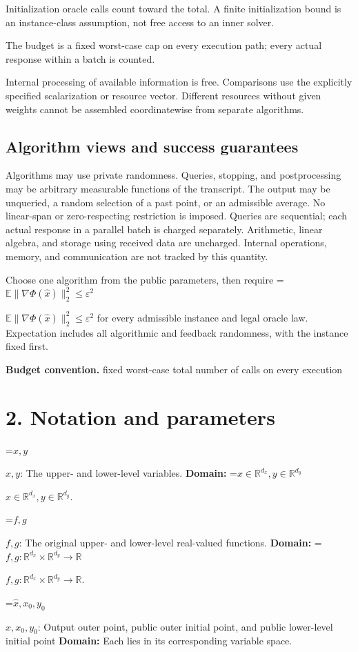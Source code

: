 \documentclass[10pt,a4paper]{article}
\newcommand{\AtlasMath}[1]{\par\begingroup\centering\setbox0=\hbox{$\displaystyle #1$}\ifdim\wd0>1.4\linewidth\typeout{ATLAS WIDE FORMULA: \the\wd0}\fi\ifdim\wd0>\linewidth\resizebox{\linewidth}{!}{\box0}\else\box0\fi\par\endgroup}
\newcommand{\AtlasInlineMath}[1]{\begingroup\setbox0=\hbox{$#1$}\ifdim\wd0>.4\linewidth\endgroup\AtlasMath{#1}\else\endgroup$#1$\fi}
\begin{document}
Initialization oracle calls count toward the total. A finite initialization bound is an instance-class assumption, not free access to an inner solver.

The budget is a fixed worst-case cap on every execution path; every actual response within a batch is counted.

Internal processing of available information is free. Comparisons use the explicitly specified scalarization or resource vector. Different resources without given weights cannot be assembled coordinatewise from separate algorithms.

\subsection{Algorithm views and success guarantees}
Algorithms may use private randomness. Queries, stopping, and postprocessing may be arbitrary measurable functions of the transcript. The output may be unqueried, a random selection of a past point, or an admissible average. No linear-span or zero-respecting restriction is imposed. Queries are sequential; each actual response in a parallel batch is charged separately. Arithmetic, linear algebra, and storage using received data are uncharged. Internal operations, memory, and communication are not tracked by this quantity.

Choose one algorithm from the public parameters, then require \AtlasInlineMath{\mathbb{E}\|\nabla\Phi(\widehat{x})\|_2^2\le\varepsilon^2} for every admissible instance and legal oracle law. Expectation includes all algorithmic and feedback randomness, with the instance fixed first.

\textbf{Budget convention.} fixed worst-case total number of calls on every execution

\section{2. Notation and parameters}
\AtlasInlineMath{x,y}: The upper- and lower-level variables. \textbf{Domain:} \AtlasInlineMath{x\in\mathbb R^{d_x},y\in\mathbb R^{d_y}}.

\AtlasInlineMath{f,g}: The original upper- and lower-level real-valued functions. \textbf{Domain:} \AtlasInlineMath{f,g:\mathbb R^{d_x}\times\mathbb R^{d_y}\to\mathbb R}.

\AtlasInlineMath{\widehat x,x_0,y_0}: Output outer point, public outer initial point, and public lower-level initial point \textbf{Domain:} Each lies in its corresponding variable space.
\end{document}
